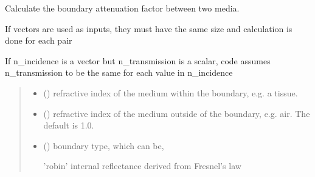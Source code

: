 \documentclass[letterpaper,10pt,english]{sphinxmanual}
\begin{document}
\begin{fulllineitems}
\label{\detokenize{_autosummary/nirfasterff.utils.boundary_attenuation:nirfasterff.utils.boundary_attenuation}}
\pysigstartsignatures
{}
\pysigstopsignatures
\sphinxAtStartPar
Calculate the boundary attenuation factor between two media.

\sphinxAtStartPar
If vectors are used as inputs, they must have the same size and calculation is done for each pair

\sphinxAtStartPar
If n\_incidence is a vector but n\_transmission is a scalar, code assumes n\_transmission to be the same for each value in n\_incidence
\begin{quote}\begin{description}
\begin{itemize}
\item {} 
\sphinxAtStartPar
{} () \textendash{} refractive index of the medium within the boundary, e.g. a tissue.

\item {} 
\sphinxAtStartPar
{} (\sphinxstyleliteralemphasis{\sphinxupquote{, }}) \textendash{} refractive index of the medium outside of the boundary, e.g. air. The default is 1.0.

\item {} 
\sphinxAtStartPar
{} (\sphinxstyleliteralemphasis{\sphinxupquote{, }}) \textendash{} 
\sphinxAtStartPar
boundary type, which can be,

\sphinxAtStartPar
’robin’  \sphinxhyphen{} internal reflectance derived from Fresnel’s law


\end{itemize}
\end{description}
\end{quote}
\end{fulllineitems}
\end{document}
